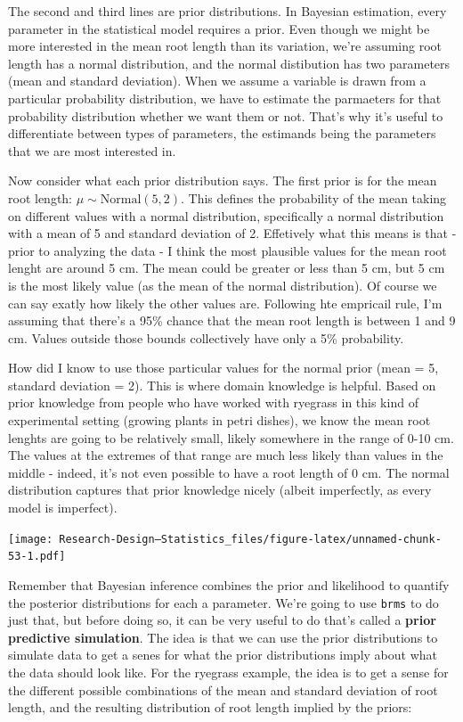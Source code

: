 \documentclass[
]{book}
\begin{document}
The second and third lines are prior distributions. In Bayesian estimation, every parameter in the statistical model requires a prior. Even though we might be more interested in the mean root length than its variation, we're assuming root length has a normal distribution, and the normal distibution has two parameters (mean and standard deviation). When we assume a variable is drawn from a particular probability distribution, we have to estimate the parmaeters for that probability distribution whether we want them or not. That's why it's useful to differentiate between types of parameters, the estimands being the parameters that we are most interested in.

Now consider what each prior distribution says. The first prior is for the mean root length: \(\mu \sim \mathrm{Normal}(5, 2)\). This defines the probability of the mean taking on different values with a normal distribution, specifically a normal distribution with a mean of 5 and standard deviation of 2. Effetively what this means is that - prior to analyzing the data - I think the most plausible values for the mean root lenght are around 5 cm. The mean could be greater or less than 5 cm, but 5 cm is the most likely value (as the mean of the normal distribution). Of course we can say exatly how likely the other values are. Following hte empricail rule, I'm assuming that there's a 95\% chance that the mean root length is between 1 and 9 cm. Values outside those bounds collectively have only a 5\% probability.

How did I know to use those particular values for the normal prior (mean = 5, standard deviation = 2). This is where domain knowledge is helpful. Based on prior knowledge from people who have worked with ryegrass in this kind of experimental setting (growing plants in petri dishes), we know the mean root lenghts are going to be relatively small, likely somewhere in the range of 0-10 cm. The values at the extremes of that range are much less likely than values in the middle - indeed, it's not even possible to have a root length of 0 cm. The normal distribution captures that prior knowledge nicely (albeit imperfectly, as every model is imperfect).

\texttt{[image: Research-Design---Statistics\_files/figure-latex/unnamed-chunk-53-1.pdf]}

Remember that Bayesian inference combines the prior and likelihood to quantify the posterior distributions for each a parameter. We're going to use \texttt{brms} to do just that, but before doing so, it can be very useful to do that's called a \textbf{prior predictive simulation}. The idea is that we can use the prior distributions to simulate data to get a senes for what the prior distributions imply about what the data should look like. For the ryegrass example, the idea is to get a sense for the different possible combinations of the mean and standard deviation of root length, and the resulting distribution of root length implied by the priors:
\end{document}
